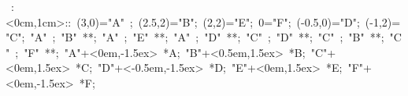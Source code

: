 \hbox{
\xy    <1cm,0cm>:<0cm,1cm>::
       (3,0)="A" ; (2.5,2)="B";  (2,2)="E";   
	   0="F";  (-0.5,0)="D";    (-1,2)="C";
       "A" ; "B" **\dir{-}; 
       "A" ; "E" **\dir{-}; 
       "A" ; "D" **\dir{-}; 
       "C" ; "D" **\dir{-}; 
       "C" ; "B" **\dir{-}; 
       "C" ; "F" **\dir{-}; 
       "A"+<0em,-1.5ex> *{A};
	   "B"+<0.5em,1.5ex> *{B};
       "C"+<0em,1.5ex> *{C};
       "D"+<-0.5em,-1.5ex> *{D};
       "E"+<0em,1.5ex> *{E};
       "F"+<0em,-1.5ex> *{F};
       \endxy}
	   